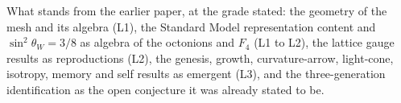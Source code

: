 What stands from the earlier paper, at the grade stated: the geometry of the mesh and its algebra (L1), the
Standard Model representation content and $\sin^2\theta_W = 3/8$ as algebra of the octonions and $F_4$ (L1 to L2),
the lattice gauge results as reproductions (L2), the genesis, growth, curvature-arrow, light-cone, isotropy,
memory and self results as emergent (L3), and the three-generation identification as the open conjecture it was
already stated to be.
